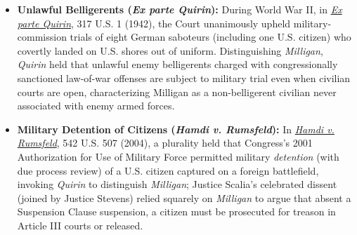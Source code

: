 \documentclass[12pt]{article}
\begin{document}
\begin{itemize}

\item \textbf{Unlawful Belligerents (\textit{Ex parte Quirin}):} During World War II, in \href{https://supreme.justia.com/cases/federal/us/317/1/}{\textit{Ex parte Quirin}}, 317 U.S. 1 (1942), the Court unanimously upheld military-commission trials of eight German saboteurs (including one U.S. citizen) who covertly landed on U.S. shores out of uniform. Distinguishing \textit{Milligan}, \textit{Quirin} held that unlawful enemy belligerents charged with congressionally sanctioned law-of-war offenses are subject to military trial even when civilian courts are open, characterizing Milligan as a non-belligerent civilian never associated with enemy armed forces.

\item \textbf{Military Detention of Citizens (\textit{Hamdi v. Rumsfeld}):} In \href{https://supreme.justia.com/cases/federal/us/542/507/}{\textit{Hamdi v. Rumsfeld}}, 542 U.S. 507 (2004), a plurality held that Congress's 2001 Authorization for Use of Military Force permitted military \textit{detention} (with due process review) of a U.S. citizen captured on a foreign battlefield, invoking \textit{Quirin} to distinguish \textit{Milligan}; Justice Scalia's celebrated dissent (joined by Justice Stevens) relied squarely on \textit{Milligan} to argue that absent a Suspension Clause suspension, a citizen must be prosecuted for treason in Article III courts or released.

\end{itemize}
\end{document}
